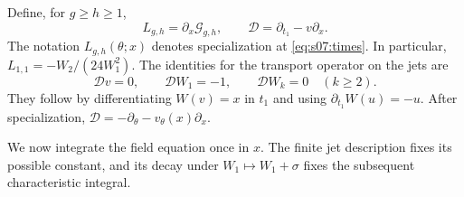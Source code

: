 Define, for $g\geq h\geq1$,
\begin{equation}\label{eq:s07:transport-definitions}
 L_{g,h}=\partial_x\mathcal G_{g,h},\qquad
 \mathscr D=\partial_{t_1}-v\partial_x.
\end{equation}
The notation $L_{g,h}(\theta;x)$ denotes specialization at
\eqref{eq:s07:times}. In particular,
$L_{1,1}=-W_2/(24W_1^2)$.
The identities for the transport operator on the jets are
\begin{equation}\label{eq:s07:jet-transport}
 \mathscr Dv=0,\qquad
 \mathscr DW_1=-1,\qquad \mathscr DW_k=0\quad(k\geq2).
\end{equation}
They follow by differentiating $W(v)=x$ in $t_1$ and using
$\partial_{t_1}W(u)=-u$. After specialization,
$\mathscr D=-\partial_\theta-v_\theta(x)\partial_x$.

We now integrate the field equation once in $x$. The finite jet
description fixes its possible constant, and its decay under
$W_1\mapsto W_1+\sigma$ fixes the subsequent characteristic integral.


